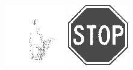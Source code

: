 \documentclass{article}
\begin{document}
\begin{figure}[t]
\begin{minipage}[c]{.21\linewidth}
  \end{minipage}
  \begin{minipage}[c]{.21\linewidth}
    \centering\centerline{\includegraphics[width=\linewidth]{imgs/gens_cal/saxophone/sums/0_0.png}}
  \end{minipage}
  \begin{minipage}[c]{.21\linewidth}
    \centering\centerline{\includegraphics[width=\linewidth]{imgs/gens_cal/stop/sums/0_0.png}}

\end{minipage}
\end{figure}
\end{document}
